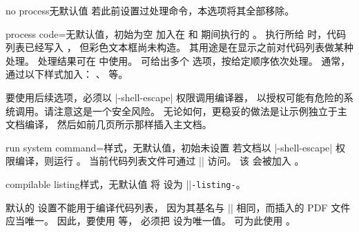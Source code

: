 \clearpage


\begin{docTcbKey}[][doc new=2014-11-14]{no process}{}{无默认值}
  若此前设置过处理命令，本选项将其全部移除。
\end{docTcbKey}

\begin{docTcbKey}[][doc new=2014-11-14]{process code}{=}{无默认值，初始为空}
  加入在  和  期间执行的 。
  执行所给  时，代码列表已经写入 ，
  但彩色文本框尚未构造。
  其用途是在显示之前对代码列表做某种处理。
  处理结果可在  中使用。
  可给出多个  选项，按给定顺序依次处理。
  通常， 通过以下样式加入：
  、 等。
\end{docTcbKey}

\begin{marker}
要使用后续选项，必须以 |-shell-escape| 权限调用编译器，
以授权可能有危险的系统调用。请注意这是一个安全风险。
无论如何，更稳妥的做法是让示例独立于主文档编译，
然后如前几页所示那样插入主文档。
\end{marker}

\begin{docTcbKey}[][doc new=2014-11-14]{run system command}{=}{样式，无默认值，初始未设置}
若文档以 |-shell-escape| 权限编译，则运行 。
当前代码列表文件可通过 |\filename@area\filename@base\filename@ext| 访问。
该  会被加入 。
\end{docTcbKey}


\begin{docTcbKey}[][doc new and updated={2014-11-14}{2016-05-27}]{compilable listing}{}{样式，无默认值}
  将  设为 |\jobname|\texttt{-listing-}。
  \begin{marker}
  默认的  设置不能用于编译代码列表，
  因为其基名与 |\jobname| 相同，而插入的 PDF 文件应当唯一。
  因此，要使用  等，
  必须把  设为唯一值。
  可为此使用 。
  \end{marker}
\end{docTcbKey}

\enlargethispage*{5mm}

